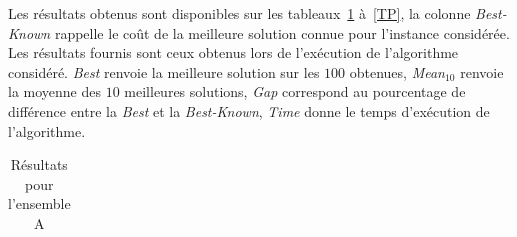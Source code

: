 \documentclass[a4paper,11pt]{article}%
\begin{document}
Les résultats obtenus sont disponibles sur les tableaux~\ref{TA} à~\ref{TP}, la colonne \emph{Best-Known} rappelle le coût de la meilleure solution connue pour l'instance considérée. 
Les résultats fournis sont ceux obtenus lors de l'exécution de l'algorithme considéré.
\emph{Best} renvoie la meilleure solution sur les $100$ obtenues, \emph{Mean$_{10}$} renvoie la moyenne des $10$ meilleures solutions, \emph{Gap} correspond au pourcentage de différence entre la \emph{Best} et la \emph{Best-Known}, \emph{Time} donne le temps d'exécution de l'algorithme.

\begin{table}[h!]
\caption{Résultats pour l'ensemble A}
\label{TA}
\begin{center}
\begin{tabular}{|@{}c@{}|@{}c@{}|@{}c@{}|@{}c@{}|@{}c@{}|@{}c@{}|}


\end{tabular}
\end{center}
\end{table}
\end{document}
